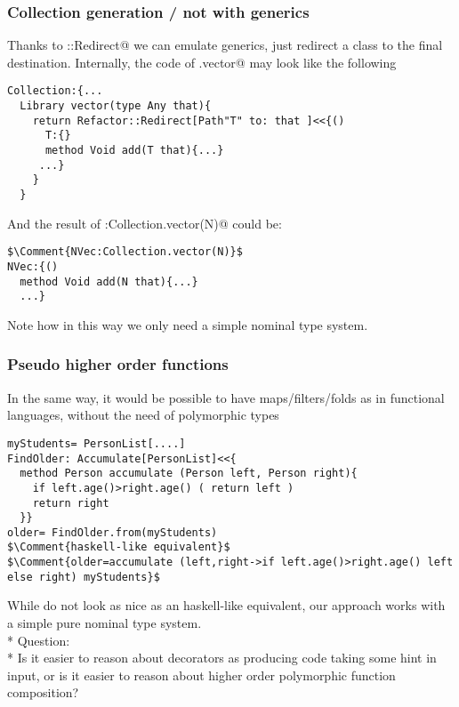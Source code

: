 \begin{frame}[fragile]
\frametitle{Collection generation / not with generics}
Thanks to \Q@Refactor::Redirect@ we can emulate generics, just redirect a class to the final destination.
Internally, the code of \Q@Collection.vector@ may look like the following
\begin{NiceCode}{59ex}{0.8}
\begin{lstlisting}
Collection:{...
  Library vector(type Any that){
    return Refactor::Redirect[Path"T" to: that ]<<{()
      T:{}
      method Void add(T that){...}
     ...}
    }
  }
\end{lstlisting}
\end{NiceCode}
And the result of \Q@NVec:Collection.vector(N)@ could be:
\begin{NiceCode}{59ex}{0.8}
\begin{lstlisting}
$\Comment{NVec:Collection.vector(N)}$
NVec:{()
  method Void add(N that){...}
  ...}
\end{lstlisting}
\end{NiceCode}


Note how in this way we only need a simple nominal type system.
\end{frame}


\begin{frame}[fragile]
\frametitle{Pseudo higher order functions}
In the same way, it would be possible to have maps/filters/folds as in functional languages, without the need of polymorphic types
\begin{NiceCode}{59ex}{0.8}
\begin{lstlisting}
myStudents= PersonList[....]
FindOlder: Accumulate[PersonList]<<{
  method Person accumulate (Person left, Person right){
    if left.age()>right.age() ( return left )
    return right
  }}
older= FindOlder.from(myStudents)
$\Comment{haskell-like equivalent}$
$\Comment{older=accumulate (left,right->if left.age()>right.age() left else right) myStudents}$
\end{lstlisting}
\end{NiceCode}
While do not look as nice as an haskell-like equivalent,
our approach works with a simple pure nominal type system.
\\*
\PresentationOnly\pause
\alert{Question:}
\\*
Is it easier to reason about decorators as producing code taking some hint in input, or
is it easier to reason about higher order polymorphic function composition?
\end{frame}


